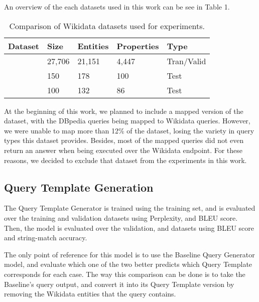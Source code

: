 An overview of the each datasets used in this work can be see in Table 1.

\begin{table}[h!]
    \centering
    \begin{tabular}{|l|l|l|l|l|}
    \hline
    \textbf{Dataset} & \textbf{Size} & \textbf{Entities} & \textbf{Properties} & \textbf{Type} \\ \hline
    \LCQuADtwo{}        & 27,706        & 21,151            & 4,447               & Tran/Valid    \\ \hline
    \QALDseven{}           & 150           & 178               & 100                 & Test          \\ \hline
    \WikiSPARQL{}       & 100           & 132               & 86                  & Test          \\ \hline
    \end{tabular}
    \caption{Comparison of Wikidata datasets used for experiments.}
    \label{table:datasetsOverview}
\end{table}

At the beginning of this work, we planned to include a mapped version of the 
\DBNQA{}~\cite{dataset:dbnqa-hartmann-marx-soru-2018} dataset,
with the DBpedia queries being mapped to Wikidata queries. However, we were unable 
to map more than 12\% of the dataset, losing the variety in query types this dataset 
provides. Besides, most of the mapped queries did not even return an answer when 
being executed over the Wikidata endpoint. For these reasons, we decided to exclude 
that dataset from the experiments in this work.

\subsection{Query Template Generation}
\label{cap4:experimentalDesign/queryTemplateGeneration}
The Query Template Generator is trained using the \LCQuADtwo{} training set, and is 
evaluated over the training and validation datasets using Perplexity, and BLEU score. 
Then, the model is evaluated over the \LCQuADtwo{} validation, \QALDseven{} and 
\WikiSPARQL{} datasets using BLEU score and string-match accuracy.

The only point of reference for this model is to use the Baseline Query Generator model, and 
evaluate which one of the two better predicts which Query Template corresponds for each case. 
The way this comparison can be done is to take the Baseline's \SPARQL{} query output, and convert it 
into its Query Template version by removing the Wikidata entities that the query contains.

